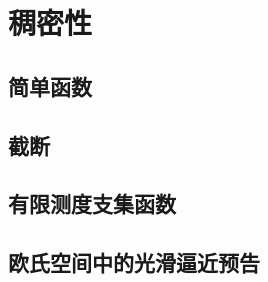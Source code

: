\section{稠密性}
\label{b1:sec:1002}


\subsection{简单函数}
\label{b1:subsec:100201}

\subsection{截断}
\label{b1:subsec:100202}

\subsection{有限测度支集函数}
\label{b1:subsec:100203}

\subsection{欧氏空间中的光滑逼近预告}
\label{b1:subsec:100204}


